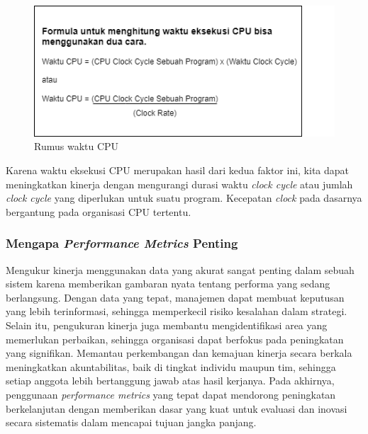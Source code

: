 \documentclass[12pt]{article}
\begin{document}
\begin{figure}
    \centering
    \includegraphics[width=\linewidth]{asset/image1.png}
    \caption{Rumus waktu CPU}
\end{figure}


\hspace*{1cm} Karena waktu eksekusi CPU merupakan hasil dari kedua faktor ini, kita dapat meningkatkan kinerja dengan mengurangi durasi waktu \textit{clock cycle} atau jumlah \textit{clock cycle} yang diperlukan untuk suatu program. Kecepatan \textit{clock} pada dasarnya bergantung pada organisasi CPU tertentu.

\subsubsection{Mengapa \textit{Performance Metrics} Penting}
\hspace*{1cm} Mengukur kinerja menggunakan data yang akurat sangat penting dalam sebuah sistem karena memberikan gambaran nyata tentang performa yang sedang berlangsung. Dengan data yang tepat, manajemen dapat membuat keputusan yang lebih terinformasi, sehingga memperkecil risiko kesalahan dalam strategi. Selain itu, pengukuran kinerja juga membantu mengidentifikasi area yang memerlukan perbaikan, sehingga organisasi dapat berfokus pada peningkatan yang signifikan. Memantau perkembangan dan kemajuan kinerja secara berkala meningkatkan akuntabilitas, baik di tingkat individu maupun tim, sehingga setiap anggota lebih bertanggung jawab atas hasil kerjanya. Pada akhirnya, penggunaan \textit{performance metrics} yang tepat dapat mendorong peningkatan berkelanjutan dengan memberikan dasar yang kuat untuk evaluasi dan inovasi secara sistematis dalam mencapai tujuan jangka panjang.
\end{document}
